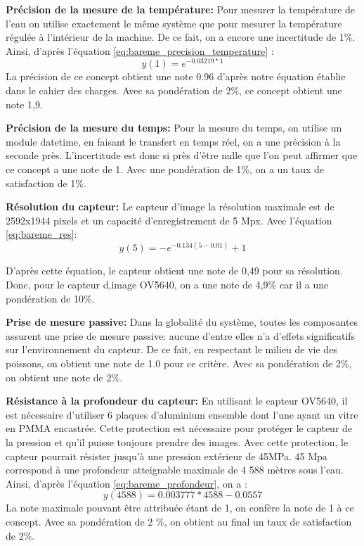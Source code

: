 \textbf{Précision de la mesure de la température:}
Pour mesurer la température de l'eau on utilise exactement le même système que pour mesurer la température régulée à l'intérieur de la machine. De ce fait, on a encore une incertitude de 1\%. Ainsi, d'après l'équation \ref{eq:bareme_precision_temperature} :
\begin{equation}
    y(1) = e^{-0.03219*1}
\end{equation}
La précision de ce concept obtient une note 0.96 d'après notre équation établie dans le cahier des charges. Avec sa pondération de 2\%, ce concept obtient une note 1,9.

\textbf{Précision de la mesure du temps:}
Pour la mesure du temps, on utilise un module datetime, en faisant le transfert en temps réel, on a une précision à la seconde près. L'incertitude est donc si près d'être nulle que l'on peut affirmer que ce concept a une note de 1. Avec une pondération de 1\%, on a un taux de satisfaction de 1\%. 

\textbf{Résolution du capteur:}
Le capteur d'image la résolution maximale est de 2592x1944 pixels et un capacité d'enregistrement de 5 Mpx. Avec l'équation \ref{eq:bareme_res}:
\begin{equation}
    y(5) = - e^{-0.134(5-0.01)}+1
\end{equation}

D'après cette équation, le capteur obtient une note de 0,49 pour sa résolution. Donc, pour le capteur d,image OV5640, on a une note de 4,9\% car il a une pondération de 10\%.

\textbf{Prise de mesure passive:}
Dans la globalité du système, toutes les composantes assurent une prise de mesure passive: aucune d'entre elles n'a d'effets significatifs sur l'environnement du capteur. De ce fait, en respectant le milieu de vie des poissons, on obtient une note de 1.0 pour ce critère. Avec sa pondération de 2\%, on obtient une note de 2\%.

\textbf{Résistance à la profondeur du capteur:}	
En utilisant le capteur OV5640, il est nécessaire d'utiliser 6 plaques d'aluminium ensemble dont l'une ayant un vitre en PMMA encastrée. Cette protection est nécessaire pour protéger le capteur de la pression et qu'il puisse toujours prendre des images. Avec cette protection, le capteur pourrait résister jusqu'à une pression extérieur de 45MPa. 45 Mpa correspond à une profondeur atteignable maximale de 4 588 mètres sous l'eau. Ainsi, d'après l'équation \ref{eq:bareme_profondeur}, on a :
\begin{equation}
y(4588) =
        0.003777 *4588-0.0557
\end{equation}
La note maximale pouvant être attribuée étant de 1, on confère la note de 1 à ce concept. Avec sa pondération de 2 \%, on obtient au final un taux de satisfaction de 2\%.

